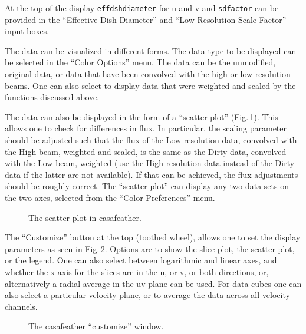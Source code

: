 At the top of the display {\tt effdshdiameter} for u and v and {\tt sdfactor} can be
provided in the ``Effective Dish Diameter'' and ``Low Resolution
Scale Factor'' input boxes. 



The data can be visualized in different forms. The data type to be
displayed can be selected in the ``Color Options'' menu. The data can
be the unmodified, original data, or data that have been convolved with
the high or low resolution beams. One can also select to display data
that were weighted and scaled by the functions discussed above.

The data can also be displayed in the form of a ``scatter plot''
(Fig.\,\ref{fig:feather-scatter}). This allows one to check for
differences in flux. In particular, the scaling parameter should be
adjusted such that the flux of the Low-resolution data, convolved with
the High beam, weighted and scaled, is the same as the Dirty data,
convolved with the Low beam, weighted (use the High resolution data
instead of the Dirty data if the latter are not available). If that can be
achieved, the flux adjustments should be roughly correct. The
``scatter plot'' can display any two data sets on the two axes,
selected from the ``Color Preferences'' menu.

\begin{figure}[h!]
\begin{center}
\caption{\label{fig:feather-scatter} The scatter plot in casafeather.} 
\hrulefill
\end{center}
\end{figure}


The ``Customize'' button at the top (toothed wheel), allows one to set
the display parameters as seen in Fig.\,\ref{fig:feather-selection}.
Options are to show the slice plot, the scatter plot, or the
legend. One can also select between logarithmic and linear axes, and
whether the x-axis for the slices are in the u, or v, or both
directions, or, alternatively a radial average in the uv-plane can be
used. For data cubes one can also select a particular velocity plane,
or to average the data across all velocity channels.

\begin{figure}[h!]
\begin{center}
\caption{\label{fig:feather-selection}  The casafeather ``customize'' window.} 
\hrulefill
\end{center}
\end{figure}







